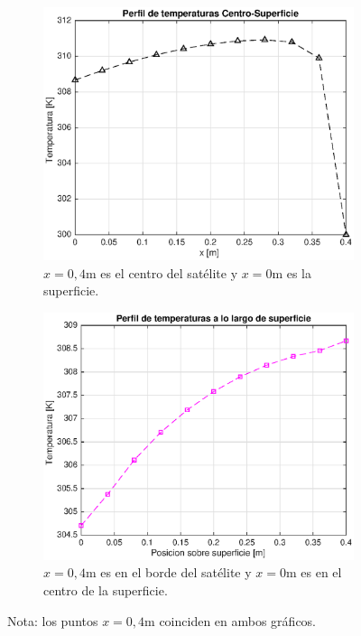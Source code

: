 \documentclass[onecolumn,10pt,titlepage,a4paper]{article}
\begin{document}
\begin{figure}[htb!]
	\centering
	\begin{subfigure}{0.47\textwidth}
		\includegraphics[width=1\textwidth]{fig/perfil9div.eps}
		\caption{$x=0,4$m es el centro del satélite y $x=0$m es la superficie.}
		\label{fig:perfilinterior}
	\end{subfigure}
	\hfill
	\begin{subfigure}{0.47\textwidth}
		\includegraphics[width=\textwidth]{fig/perfilRad9div.eps}
		\caption{$x=0,4$m es en el borde del satélite y $x=0$m es en el centro de la superficie.}
		\label{fig:perfilsuperficie}
	\end{subfigure}
\caption{Nota: los puntos $x=0,4$m coinciden en ambos gráficos.}
\end{figure}


% 
\end{document}

